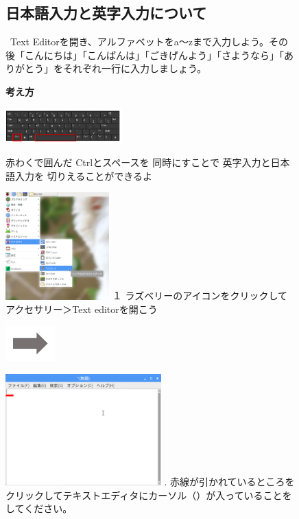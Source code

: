 \documentclass[a4paper,12pt]{jarticle}
\begin{document}
\clearpage
\begin{figure}[ht]
  \subsection{\theExercise 日本語入力と英字入力について}
  \ Text
  Editorを開き、アルファベットをa〜zまで入力しよう。その後「こんにちは」「こんばんは」「ごきげんよう」「さようなら」「ありがとう」をそれぞれ一行に入力しましょう。

  {\bf\large 考え方}


  \centering
  \begin{minipage}{\textwidth}
    \includegraphics[width=0.4\textwidth]{textbook-img065.png}
    \raisebox{10mm}
    {
      \begin{minipage}{0.5\textwidth}
        赤わくで囲んだ
        Ctrlとスペースを
        同時にすことで
        英字入力と日本語入力を
        切りえることができるよ
      \end{minipage}
    }
  \end{minipage}

  \begin{minipage}{0.4\textwidth}
    \includegraphics[width=4cm]{textbook-img064.png}
    \flushleft
    １
    ラズベリーのアイコンをクリックしてアクセサリー＞Text
    editorを開こう
  \end{minipage}
  \includegraphics[width=1.919cm]{textbook-img053.png}
  \begin{minipage}{7.347cm}
    \includegraphics[width=6cm]{textbook-img063.png}
    .
    赤線が引かれているところをクリックしてテキストエディタにカーソル（）が入っていることをしてください。
  \end{minipage}


\end{figure}
\end{document}
